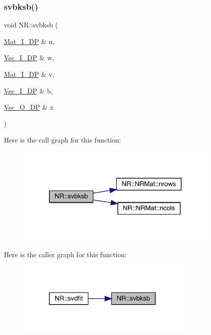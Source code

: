 \mbox{\label{namespaceNR_a5ae2173a7b10fd0f4e35baaad45f16f8}} 
\subsubsection{\texorpdfstring{svbksb()}{svbksb()}}
{\footnotesize\ttfamily void N\+R\+::svbksb (\begin{DoxyParamCaption}\item[{\mbox{\hyperlink{namespaceNR_a2b8abfda8fffad6ba0a1b5a4c0773dbf}{Mat\+\_\+\+I\+\_\+\+DP}} \&}]{u,  }\item[{\mbox{\hyperlink{namespaceNR_a9f943da53862537c552e2a770cb170ae}{Vec\+\_\+\+I\+\_\+\+DP}} \&}]{w,  }\item[{\mbox{\hyperlink{namespaceNR_a2b8abfda8fffad6ba0a1b5a4c0773dbf}{Mat\+\_\+\+I\+\_\+\+DP}} \&}]{v,  }\item[{\mbox{\hyperlink{namespaceNR_a9f943da53862537c552e2a770cb170ae}{Vec\+\_\+\+I\+\_\+\+DP}} \&}]{b,  }\item[{\mbox{\hyperlink{namespaceNR_a970094d23441f8ef6a45282a7eb2103d}{Vec\+\_\+\+O\+\_\+\+DP}} \&}]{x }\end{DoxyParamCaption})}

Here is the call graph for this function\+:
\nopagebreak
\begin{figure}[H]
\begin{center}
\leavevmode
\includegraphics[width=282pt]{da/d46/namespaceNR_a5ae2173a7b10fd0f4e35baaad45f16f8_cgraph}
\end{center}
\end{figure}
Here is the caller graph for this function\+:
\nopagebreak
\begin{figure}[H]
\begin{center}
\leavevmode
\includegraphics[width=242pt]{da/d46/namespaceNR_a5ae2173a7b10fd0f4e35baaad45f16f8_icgraph}
\end{center}
\end{figure}
\mbox{\label{namespaceNR_ad532389e2c426c3c38b860f4fd254103}} 

